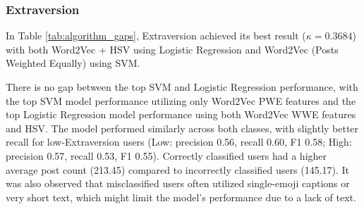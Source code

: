 \subsubsection{Extraversion}

In Table \ref{tab:algorithm_gaps}, Extraversion achieved its best result ($\kappa = 0.3684$) with both Word2Vec + HSV using Logistic Regression and Word2Vec (Posts Weighted Equally) using SVM.

There is no gap between the top SVM and Logistic Regression performance, with the top SVM model performance utilizing only Word2Vec PWE features and the top Logistic Regression model performance using both Word2Vec WWE features and HSV. The model performed similarly across both classes, with slightly better recall for low-Extraversion users (Low: precision 0.56, recall 0.60, F1 0.58; High: precision 0.57, recall 0.53, F1 0.55). Correctly classified users had a higher average post count (213.45) compared to incorrectly classified users (145.17). It was also observed that misclassified users often utilized single-emoji captions or very short text, which might limit the model's performance due to a lack of text. 

